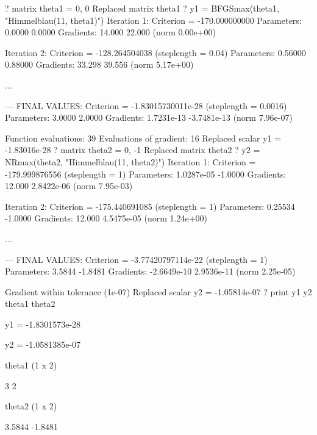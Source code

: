 \begin{table}[ht]
  \begin{footnotesize}
\begin{scode}
? matrix theta1 = { 0, 0 }
Replaced matrix theta1
? y1 = BFGSmax(theta1, "Himmelblau(11, theta1)")
Iteration 1: Criterion = -170.000000000
Parameters:       0.0000      0.0000
Gradients:        14.000      22.000 (norm 0.00e+00)

Iteration 2: Criterion = -128.264504038 (steplength = 0.04)
Parameters:      0.56000     0.88000
Gradients:        33.298      39.556 (norm 5.17e+00)

...

--- FINAL VALUES: 
Criterion = -1.83015730011e-28 (steplength = 0.0016)
Parameters:       3.0000      2.0000
Gradients:    1.7231e-13 -3.7481e-13 (norm 7.96e-07)

Function evaluations: 39
Evaluations of gradient: 16
Replaced scalar y1 = -1.83016e-28
? matrix theta2 = { 0, -1 }
Replaced matrix theta2
? y2 = NRmax(theta2, "Himmelblau(11, theta2)")
Iteration 1: Criterion = -179.999876556 (steplength = 1)
Parameters:   1.0287e-05     -1.0000
Gradients:        12.000  2.8422e-06 (norm 7.95e-03)

Iteration 2: Criterion = -175.440691085 (steplength = 1)
Parameters:      0.25534     -1.0000
Gradients:        12.000  4.5475e-05 (norm 1.24e+00)

...

--- FINAL VALUES: 
Criterion = -3.77420797114e-22 (steplength = 1)
Parameters:       3.5844     -1.8481
Gradients:   -2.6649e-10  2.9536e-11 (norm 2.25e-05)

Gradient within tolerance (1e-07)
Replaced scalar y2 = -1.05814e-07
? print y1 y2 theta1 theta2

             y1 = -1.8301573e-28

             y2 = -1.0581385e-07

theta1 (1 x 2)

  3   2 

theta2 (1 x 2)

      3.5844      -1.8481 
\end{scode}
    
  \end{footnotesize}
  \caption{Output from maximization}
  \label{tab:optim-output}
\end{table}

